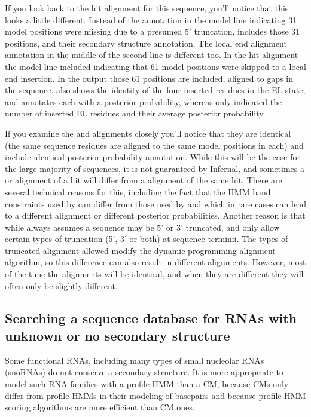 If you look back to the  hit alignment for this sequence,
you'll notice that this looks a little different. Instead of the
\otext{<[31]*} annotation in the model line indicating 31 model
positions were missing due to a presumed 5' truncation, 
includes those 31 positions, and their secondary structure
annotation. The local end alignment annotation in the middle of the
second line is different too. In the  hit alignment the
model line included \otext{*[61]*} indicating that 61 model positions
were skipped to a local end insertion. In the  output
those 61 positions are included, aligned to gaps in the sequence. 
 also shows the identity of the four inserted residues
in the EL state, and annotates each with a posterior probability,
whereas  only indicated the number of inserted EL
residues and their average posterior probability. 

If you examine the  and  alignments closely
you'll notice that they are identical (the same sequence residues are
aligned to the same model positions in each) and include identical
posterior probability annotation. While this will be the case for the
large majority of sequences, it is not guaranteed by Infernal, and
sometimes a  or  alignment of a hit will
differ from a  alignment of the same hit. There are
several technical reasons for this, including the fact that the HMM
band constraints used by  can differ from those used by
 and  which in rare cases can lead to a
different alignment or different posterior probabilities. Another
reason is that while  always assumes a sequence may be
5' or 3' truncated,  and  only allow
certain types of truncation (5', 3' or both) at sequence
terminii. The types of truncated alignment allowed modify the
dynamic programming alignment algorithm, so this difference can also
result in different alignments. However, most of the time the
alignments will be identical, and when they are different they will
often only be slightly different.

\subsection{Searching a sequence database for RNAs with unknown or no
 secondary structure}

Some functional RNAs, including many types of small nucleolar RNAs
(snoRNAs) do not conserve a secondary structure. It is more
appropriate to model such RNA families with a profile HMM than a CM,
because CMs only differ from profile HMMs in their modeling of
basepairs and because profile HMM scoring algorithms are more
efficient than CM ones.


